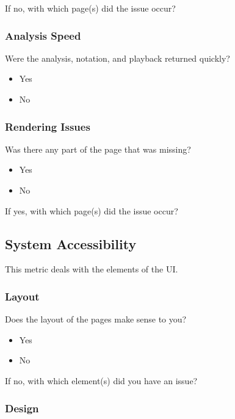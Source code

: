 \noindent If no, with which page(s) did the issue occur?

\subsubsection{Analysis Speed}
\label{subsubsec:analysisspeed}

Were the analysis, notation, and playback returned quickly?

\begin{itemize}
	\item Yes
	\item No
\end{itemize}

\subsubsection{Rendering Issues}
\label{subsubsec:renderingissues}

Was there any part of the page that was missing?

\begin{itemize}
	\item Yes
	\item No
\end{itemize}

\noindent If yes, with which page(s) did the issue occur?

\subsection{System Accessibility}
\label{subsec:systemaccessibility}

This metric deals with the elements of the UI.

\subsubsection{Layout}
\label{subsubsec:layout}

Does the layout of the pages make sense to you?

\begin{itemize}
	\item Yes
	\item No
\end{itemize}

\noindent If no, with which element(s) did you have an issue?

\subsubsection{Design}
\label{subsubsec:design}

